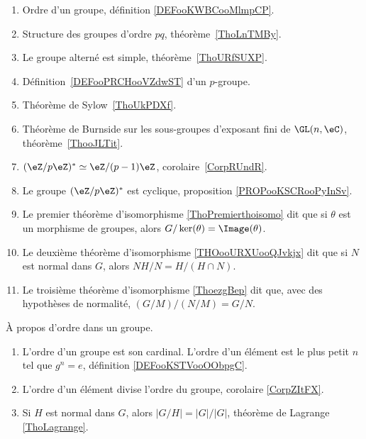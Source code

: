 \begin{enumerate}
	\item Ordre d'un groupe, définition \ref{DEFooKWBCooMlmpCP}.
	\item Structure des groupes d'ordre \( pq\), théorème~\ref{ThoLnTMBy}.
	\item Le groupe alterné est simple, théorème~\ref{ThoURfSUXP}.
	\item Définition~\ref{DEFooPRCHooVZdwST} d'un \( p\)-groupe.
	\item Théorème de Sylow~\ref{ThoUkPDXf}.
	\item Théorème de Burnside sur les sous-groupes d'exposant fini de \( \GL(n,\eC)\), théorème~\ref{ThooJLTit}.
	\item \( (\eZ/p\eZ)^*\simeq \eZ/(p-1)\eZ\), corolaire~\ref{CorpRUndR}.
	\item
	      Le groupe \( (\eZ/p\eZ)^*\) est cyclique, proposition \ref{PROPooKSCRooPyInSv}.
	\item Le premier théorème d'isomorphisme \ref{ThoPremierthoisomo} dit que si \( \theta\) est un morphisme de groupes, alors  \( G/\ker(\theta)=\Image(\theta)\).
	\item Le deuxième théorème d'isomorphisme \ref{THOooURXUooQJvkjx} dit que si \( N\) est normal dans \( G\), alors \( NH/N=H/(H\cap N)\).
	\item Le troisième théorème d'isomorphisme \ref{ThoezgBep} dit que, avec des hypothèses de normalité, \( (G/M)/(N/M)=G/N\).
\end{enumerate}

À propos d'ordre dans un groupe.
\begin{enumerate}
	\item
	      L'ordre d'un groupe est son cardinal. L'ordre d'un élément est le plus petit \( n\) tel que \( g^n=e\), définition \ref{DEFooKSTVooOObpgC}.
	\item
	      L'ordre d'un élément divise l'ordre du groupe, corolaire \ref{CorpZItFX}.
	\item
	      Si \( H\) est normal dans \( G\), alors \( | G/H |=| G |/| G |\), théorème de Lagrange \ref{ThoLagrange}.
\end{enumerate}
